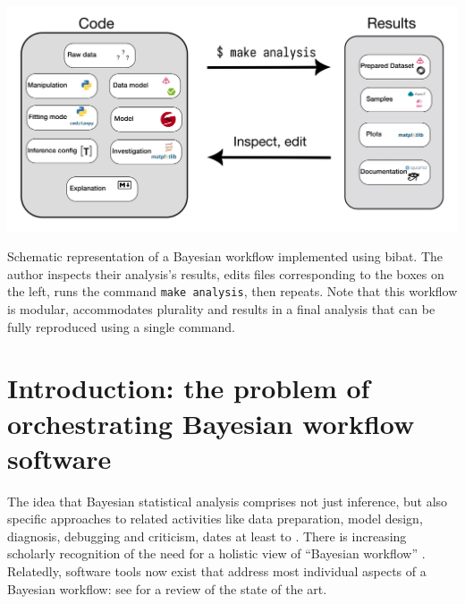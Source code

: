 \documentclass[sigconf, review]{acmart}
\begin{document}
\begin{teaserfigure}
  \includegraphics[width=\textwidth]{img/workflow.png}
  \caption{Schematic representation of a Bayesian workflow implemented
using bibat. The author inspects their analysis's results, edits files
corresponding to the boxes on the left, runs the command
\texttt{make\ analysis}, then repeats. Note that this workflow is
modular, accommodates plurality and results in a final analysis that can
be fully reproduced using a single command.}
\end{teaserfigure}

\maketitle

\setlength{\parskip}{-0.1pt}

\section{Introduction: the problem of orchestrating Bayesian workflow
software}\label{introduction-the-problem-of-orchestrating-bayesian-workflow-software}

The idea that Bayesian statistical analysis comprises not just
inference, but also specific approaches to related activities like data
preparation, model design, diagnosis, debugging and criticism, dates at
least to \citet{boxBayesianInferenceStatistical1992}. There is
increasing scholarly recognition of the need for a holistic view of
``Bayesian workflow''
\citep{gelmanBayesianWorkflow2020, grinsztajnBayesianWorkflowDisease2021, gabryVisualizationBayesianWorkflow2019}.
Relatedly, software tools now exist that address most individual aspects
of a Bayesian workflow: see \citet{strumbeljPresentFutureSoftware} for a
review of the state of the art.
\end{document}

